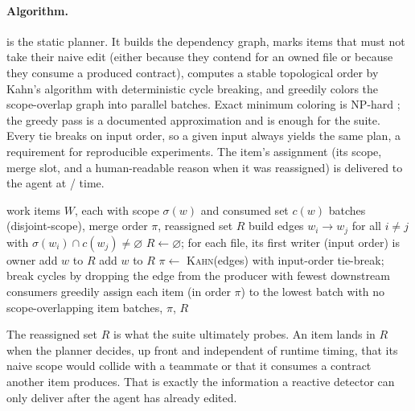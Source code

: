 \paragraph{Algorithm.}  is the static planner. It
builds the dependency graph, marks items that must not take their naive edit (either because they
contend for an owned file or because they consume a produced contract), computes a stable
topological order by Kahn's algorithm \citep{kahn1962topological} with deterministic cycle
breaking, and greedily colors the scope-overlap graph into parallel batches. Exact minimum coloring
is NP-hard \citep{garey1979computers}; the greedy pass is a documented approximation and is enough
for the suite. Every tie breaks on input order, so a given input always yields the same plan, a
requirement for reproducible experiments. The item's assignment (its scope, merge slot, and a
human-readable reason when it was reassigned) is delivered to the agent at /
time.

\begin{algorithm}[t]
\caption{\textsc{BuildPlan} (static coordination planner)}
\label{alg:plan}
\begin{algorithmic}[1]
\Require work items $W$, each with scope $\sigma(w)$ and consumed set $c(w)$
\Ensure batches (disjoint-scope), merge order $\pi$, reassigned set $R$
\State build edges $w_i\!\rightarrow\!w_j$ for all $i\neq j$ with $\sigma(w_i)\cap c(w_j)\neq\varnothing$
\State $R \gets \varnothing$; for each file, its first writer (input order) is owner
    \State add $w$ to $R$ 
\EndFor
{}
    \State add $w$ to $R$ 
\EndFor
\State $\pi \gets$ \textsc{Kahn}(edges) with input-order tie-break; break cycles by dropping the edge from the producer with fewest downstream consumers
\State greedily assign each item (in order $\pi$) to the lowest batch with no scope-overlapping item
\State \Return batches, $\pi$, $R$
\end{algorithmic}
\end{algorithm}

The reassigned set $R$ is what the suite ultimately probes. An item lands in $R$ when the planner
decides, up front and independent of runtime timing, that its naive scope would collide with a
teammate or that it consumes a contract another item produces. That is exactly the information a
reactive detector can only deliver after the agent has already edited.

